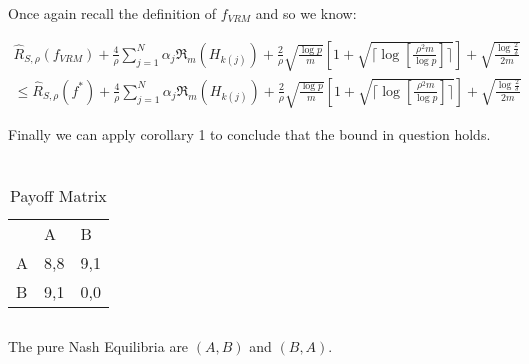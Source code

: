 \documentclass[]{article}
\begin{document}
\noindent Once again recall the definition of $f_{VRM}$ and so we know:

\begin{equation}
\begin{split}
\hat{R}_{S,\rho}\left(f_{VRM}\right) + \frac{4}{\rho} \sum_{j=1}^{N} \alpha_j \mathfrak{R}_m \left( H_{k \left( j \right)} \right) + \frac{2}{\rho} \sqrt{\frac{\log p}{m}} \left[1+\sqrt{\lceil \log \left[ \frac{\rho^2 m}{\log p} \right]\rceil}\right] + \sqrt{\frac{\log \frac{2}{\delta}}{2m}} \\
\le \hat{R}_{S,\rho}\left(f^*\right) + \frac{4}{\rho} \sum_{j=1}^{N} \alpha_j \mathfrak{R}_m \left( H_{k \left( j \right)} \right) + \frac{2}{\rho} \sqrt{\frac{\log p}{m}} \left[1+\sqrt{\lceil \log \left[ \frac{\rho^2 m}{\log p} \right]\rceil}\right] + \sqrt{\frac{\log \frac{2}{\delta}}{2m}}
\end{split}
\end{equation}

\noindent Finally we can apply corollary 1 to conclude that the bound in question holds.

\section{}
\section{}
\begin{table}[H]
	\centering
	\caption{Payoff Matrix}
	\label{fig:C3}
	\begin{tabular}{lll}
		& A                        & B                        \\ \cline{2-3} 
		\multicolumn{1}{l|}{A} & \multicolumn{1}{l|}{8,8} & \multicolumn{1}{l|}{9,1} \\ \cline{2-3} 
		\multicolumn{1}{l|}{B} & \multicolumn{1}{l|}{9,1} & \multicolumn{1}{l|}{0,0} \\ \cline{2-3} 
	\end{tabular}
\end{table}
\subsection{}
The pure Nash Equilibria are $\left( A, B \right)$ and $\left( B, A \right)$.
\end{document}
